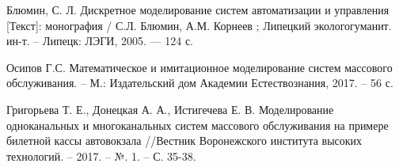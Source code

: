 \begin{thebibliography}{}
 Блюмин, С. Л. Дискретное моделирование систем автоматизации и управления [Текст]: монография / С.Л. Блюмин, А.М. Корнеев ; Липецкий экологогуманит. ин-т. -- Липецк: ЛЭГИ, 2005. --- 124 с.

 Осипов Г.С. Математическое и имитационное моделирование систем массового
обслуживания. – М.: Издательский дом Академии Естествознания, 2017. – 56 с.

 Григорьева Т. Е., Донецкая А. А., Истигечева Е. В. Моделирование одноканальных и многоканальных систем массового обслуживания на примере билетной кассы автовокзала //Вестник Воронежского института высоких технологий. – 2017. – №. 1. – С. 35-38.

\end{thebibliography}